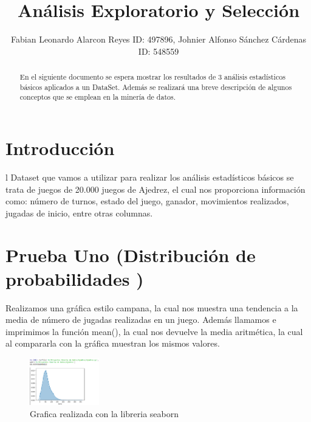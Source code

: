 \documentclass[journal]{IEEEtran}
\begin{document}
\title{Análisis Exploratorio y Selección}

\author{Fabian Leonardo Alarcon Reyes ID: 497896,
Johnier Alfonso Sánchez Cárdenas ID: 548559 } %



\maketitle

\begin{abstract}
En el siguiente documento se espera mostrar los resultados de 3 análisis estadísticos básicos aplicados a un DataSet. Además se realizará una breve descripción de algunos conceptos que se emplean en la minería de datos. 
\end{abstract}



\section{Introducción}

l Dataset que vamos a utilizar para realizar los análisis estadísticos básicos se trata de juegos de 20.000 juegos de Ajedrez, el cual nos proporciona información como: número de turnos, estado del juego, ganador, movimientos realizados, jugadas de inicio, entre otras columnas.\\

\section{Prueba Uno (Distribución de probabilidades )}
Realizamos una gráfica estilo campana, la cual nos muestra una tendencia a la media de número de jugadas realizadas en un juego. Además llamamos e imprimimos la función mean(), la cual nos devuelve la media aritmética, la cual al compararla con la gráfica muestran los mismos valores.  

\begin{figure}[h!]
\centering
\includegraphics[width=0.27\textwidth]{ImagenesA/PruebaUno.png}
\caption{Grafica realizada con la libreria seaborn}
\end{figure}
\end{document}

